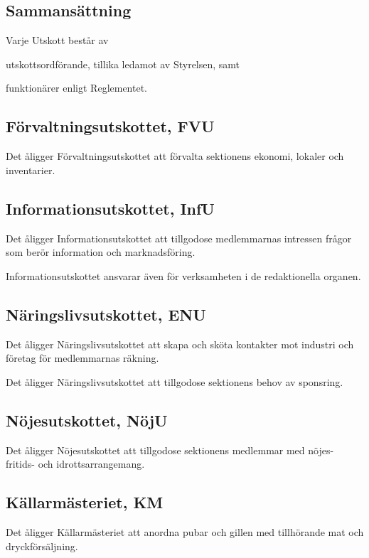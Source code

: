 \documentclass[10pt]{article}
\begin{document}
    \subsection{Sammansättning}
    Varje Utskott består av
    \begin{alphlist}
    \item utskottsordförande, tillika ledamot av Styrelsen, samt
    \item funktionärer enligt Reglementet.
    \end{alphlist}
    
    \subsection{Förvaltningsutskottet, FVU}
    Det åligger Förvaltningsutskottet att förvalta sektionens ekonomi,
    lokaler och inventarier.
    
    \subsection{Informationsutskottet, InfU}
    Det åligger Informationsutskottet att tillgodose medlemmarnas
    intressen frågor som berör information och marknadsföring.
    
    Informationsutskottet ansvarar även för verksamheten i de redaktionella
    organen.
    
    \subsection{Näringslivsutskottet, ENU}
    Det åligger Näringslivsutskottet att skapa och
    sköta kontakter mot industri och företag för medlemmarnas räkning.
    
    Det åligger Näringslivsutskottet att tillgodose
    sektionens behov av sponsring.
    
    \subsection{Nöjesutskottet, NöjU}
    Det åligger Nöjesutskottet att tillgodose sektionens medlemmar med
    nöjes- fritids- och idrottsarrangemang.
    
    \subsection{Källarmästeriet, KM}
    Det åligger Källarmästeriet att anordna pubar och gillen med tillhörande mat
    och dryckförsäljning.
    
\end{document}
